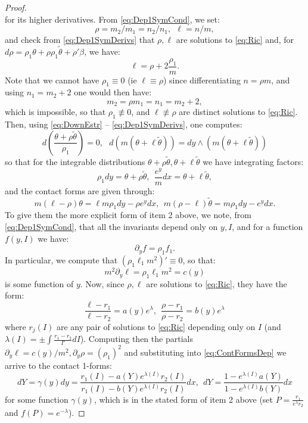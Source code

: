 \documentclass[10pt,a4paper]{amsart}
\newcommand{\del}{\partial}
\begin{document}
\begin{proof}
\begin{equation}
\end{equation} 
for its higher derivatives.
From \eqref{eq:Dep1SymCond}, we set:
\[ \rho = m_2/m_1 = n_2/n_1, ~~\ell = n/m,  \]
and check from \eqref{eq:Dep1SymDerivs} that $\rho, \ell$ are solutions to \eqref{eq:Ric} and, for $d\rho = \rho_1\theta + \rho \rho_1\tilde\theta + \rho'\beta$, we have:
\[ \ell = \rho + 2\frac{\rho_1}{m}. \]
Note that we cannot have $\rho_1\equiv 0$ (ie $\ell\equiv\rho$) since differentiating $n = \rho m$, and using $n_1 = m_2 + 2$ one would then have:
\[ m_2 = \rho m_1 = n_1 = m_2 + 2, \]
which is impossible, so that $\rho_1\not\equiv 0$, and $\ell\not\equiv\rho$ are distinct solutions to \eqref{eq:Ric}. Then, using \eqref{eq:DownEstr} -- \eqref{eq:Dep1SymDerivs}, one computes:
\[ d\left( \frac{\theta + \rho\tilde\theta}{\rho_1} \right) = 0 , ~~~ d\left( m (\theta + \ell\tilde\theta) \right) = dy \wedge \left( m(\theta + \ell\tilde\theta) \right)  \]
so that for the integrable distributions $\theta + \rho\tilde\theta, \theta + \ell \tilde\theta$ we have integrating factors:
\[ \rho_1dy = \theta + \rho\tilde\theta, ~~ \frac{e^y}{m} dx = \theta + \ell\tilde\theta, \]
and the contact forms are given through:
\begin{equation}\label{eq:ContFormsDep}
    m(\ell - \rho) \theta = \ell m\rho_1 dy - \rho e^{y} dx, ~~m(\rho - \ell)\tilde\theta = m\rho_1dy - e^y dx.
\end{equation}
To give them the more explicit form of item 2 above, we note, from \eqref{eq:Dep1SymCond}, that all the invariants depend only on $y, I$, and for a function $f(y,I)$ we have:
\[ \del_yf = \rho_1f_1. \]
In particular, we compute that $(\rho_1\ell_1 m^2)' \equiv 0$, so that:
\[ m^2 \del_y\ell  = \rho_1\ell_1 m^2 = c(y) \]
is some function of $y$. Now, since $\rho, \ell$ are solutions to \eqref{eq:Ric}, they have the form:
\[ \frac{\ell - r_1}{\ell - r_2} = a(y) e^\lambda, ~~\frac{\rho - r_1}{\rho - r_2} = b(y) e^\lambda \]
where $r_j(I)$ are any pair of solutions to \eqref{eq:Ric} depending only on $I$ (and $\lambda(I) = \pm \int \frac{r_1 - r_2}{I'} dI$). Computing then the partials $\del_y\ell = c(y)/m^2, \del_y\rho = (\rho_1)^2$ and substituting into \eqref{eq:ContFormsDep} we arrive to the contact 1-forms:
\[ dY = \gamma(y) dy = \frac{r_1(I) - a(Y) e^{\lambda(I)}r_2(I) }{r_1(I) - b(Y) e^{\lambda(I)}r_2(I)} dx, ~~dY = \frac{1 - e^{\lambda(I)}a(Y)}{1 - e^{\lambda(I)}b(Y)}dx \]
for some function $\gamma(y)$,
which is in the stated form of item 2 above (set $P = \frac{r_1}{e^\lambda r_2}$ and $f(P) = e^{-\lambda}$).
\end{proof}
\end{document}
